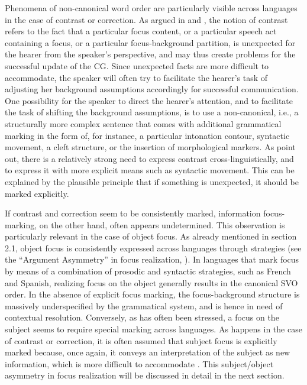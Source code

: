 Phenomena of non-canon\-i\-cal word order are particularly visible across languages in the case of contrast or correction. As argued in \textcite{zimmermann2008contrastive} and \textcite{REPP20101333}, the notion of contrast refers to the fact that a particular focus content, or a particular speech act containing a focus, or a particular focus-background partition, is unexpected for the hearer from the speaker’s perspective, and may thus create problems for the successful update of the CG. Since unexpected facts are more difficult to accommodate, the speaker will often try to facilitate the hearer’s task of adjusting her background assumptions accordingly for successful communication. One possibility for the speaker to direct the hearer’s attention, and to facilitate the task of shifting the background assumptions, is to use a non-canonical, i.e., a structurally more complex sentence that comes with additional grammatical marking in the form of, for instance, a particular intonation contour, syntactic movement, a cleft structure, or the insertion of morphological markers. As \textcite{krifka2012expression} point out, there is a relatively strong need to express contrast cross-linguistically, and to express it with more explicit means such as syntactic movement. This can be explained by the plausible principle that if something is unexpected, it should be marked explicitly.

If contrast and correction seem to be consistently marked, information focus-marking, on the other hand, often appears undetermined. This observation is particularly relevant in the case of object focus. As already mentioned in section 2.1, object focus is consistently expressed across languages through  strategies (see the ``Argument Asymmetry” in focus realization, \cite{skopeteas2010focus}). In languages that mark focus by means of a combination of prosodic and syntactic strategies, such as French and Spanish, realizing focus on the object generally results in the canonical SVO order. In the absence of explicit focus marking, the focus-background structure is massively underspecified by the grammatical system, and is hence in need of contextual resolution. Conversely, as has  often been stressed, a focus on the subject seems to require special marking across languages. As happens in the case of contrast or correction, it is often assumed that subject focus is explicitly marked because, once again, it conveys an  interpretation of the subject as new information, which is more difficult to accommodate \parencite{lambrecht2000subjects}.
This subject/object asymmetry in focus realization will be discussed in detail in the next section.


